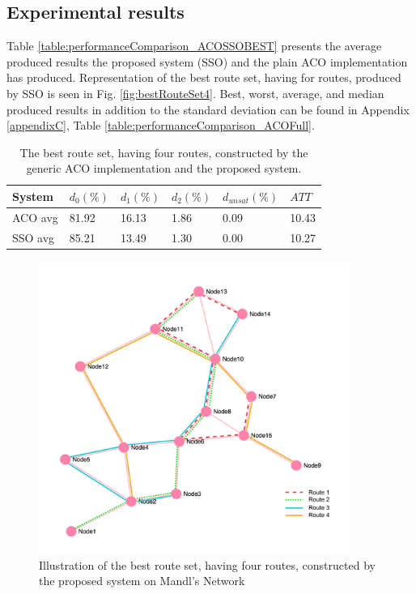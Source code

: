 \subsection{Experimental results}
\label{subsec:performanceComparison_results}


Table \vref{table:performanceComparison_ACOSSOBEST} presents the average produced results the proposed system (SSO) and the plain ACO implementation has produced. Representation of the best route set, having for routes, produced by SSO is seen in Fig. \vref{fig:bestRouteSet4}. Best, worst, average, and median produced results in addition to the standard deviation can be found in Appendix \ref{appendixC}, Table \vref{table:performanceComparison_ACOFull}.

    \begin{table}[H]
    \centering
    \begin{tabular}{|l||l|l|l|l|l|}
    \hline
    \textbf{System} & \textbf{$d_0(\%)$} & \textbf{$d_1(\%)$} & \textbf{$d_2(\%)$} & \textbf{$d_{unsat}(\%)$} & \textbf{$ATT$} \\
    \hline
    ACO avg & 81.92 & 16.13 & 1.86 & 0.09 & 10.43\\
    \hline
    SSO avg & 85.21 & 13.49 & 1.30 & 0.00 & 10.27\\
    \hline
    \end{tabular}
    \caption {The best route set, having four routes, constructed by the generic ACO implementation and the proposed system.}
    \label{table:performanceComparison_ACOSSOBEST}
    \end{table}

   

\begin{figure}[H]
    \begin{center}
    \includegraphics[width=4in]{assets/mandlnetwork_4routes.png}
    \end{center}
    \caption{Illustration of the best route set, having four routes, constructed by the proposed system on Mandl's Network}
    \label{fig:bestRouteSet4} 
\end{figure}


